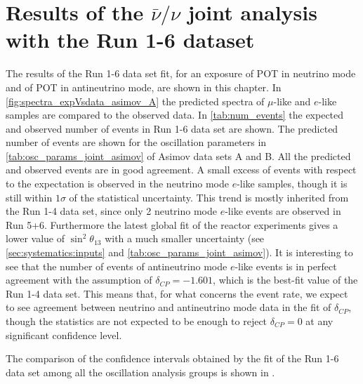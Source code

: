 
\clearpage

\section {Results of the $\bar{\nu}/\nu$ joint analysis with the Run 1-6 dataset}
\label{sec:results}

The results of the Run 1-6 data set fit,
for an exposure 
of \TotalPotNu POT in neutrino mode
and
of \TotalPotNuBar POT in antineutrino mode, 
are shown in this chapter.
In \cref{fig:spectra_expVsdata_asimov_A} the predicted spectra of $\mu$-like and $e$-like samples
are compared to the observed data.
In \cref{tab:num_events} the expected and observed number of events in Run 1-6 data set are shown.
The predicted number of events are shown for the oscillation parameters in \cref{tab:osc_params_joint_asimov}
of Asimov data sets A and B.
All the predicted and observed events are in good agreement.
A small excess of events with respect to the expectation is observed in 
the neutrino mode $e$-like samples, though it is still within $1\sigma$ of the statistical uncertainty.
This trend is mostly inherited from the Run 1-4 data set, since only 2 neutrino mode $e$-like events
are observed in Run 5+6.
Furthermore the latest global fit of the reactor experiments 
gives a lower value of $\sin^2 \theta_{13}$ 
with a much smaller uncertainty (see \cref{sec:systematics:inputs} and \cref{tab:osc_params_joint_asimov}).
It is interesting to see that the number of events of antineutrino mode $e$-like events 
is in perfect agreement with the assumption of $\delta_{CP} = -1.601$,
which is the best-fit value of the Run 1-4 data set. 
This means that, for what concerns the event rate, we expect to see
agreement between neutrino and antineutrino mode data in the fit of $\delta_{CP}$,
though the statistics are not expected to be enough to reject 
$\delta_{CP}=0$ at any significant confidence level.  

The comparison of the confidence intervals obtained by the fit of the Run 1-6 data set
among all the oscillation analysis groups is shown in \cite{Mach3JointFitRun16}.


\clearpage


